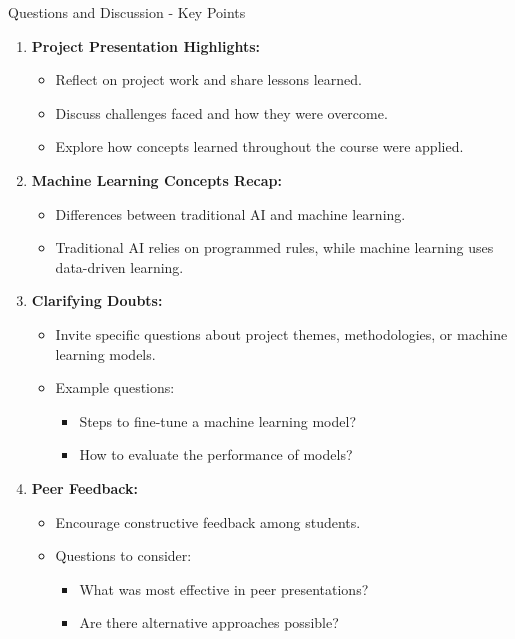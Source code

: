 \documentclass[aspectratio=169]{beamer}
\begin{document}
\begin{frame}[fragile]{Questions and Discussion - Key Points}
    \begin{enumerate}
        \item \textbf{Project Presentation Highlights:}
        \begin{itemize}
            \item Reflect on project work and share lessons learned.
            \item Discuss challenges faced and how they were overcome.
            \item Explore how concepts learned throughout the course were applied.
        \end{itemize}
        
        \item \textbf{Machine Learning Concepts Recap:}
        \begin{itemize}
            \item Differences between traditional AI and machine learning.
            \item Traditional AI relies on programmed rules, while machine learning uses data-driven learning.
        \end{itemize}
        
        \item \textbf{Clarifying Doubts:}
        \begin{itemize}
            \item Invite specific questions about project themes, methodologies, or machine learning models.
            \item Example questions: 
            \begin{itemize}
                \item Steps to fine-tune a machine learning model?
                \item How to evaluate the performance of models?
            \end{itemize}
        \end{itemize}
        
        \item \textbf{Peer Feedback:}
        \begin{itemize}
            \item Encourage constructive feedback among students.
            \item Questions to consider:
            \begin{itemize}
                \item What was most effective in peer presentations?
                \item Are there alternative approaches possible?
            \end{itemize}
        \end{itemize}
        

\end{enumerate}
\end{frame}
\end{document}
